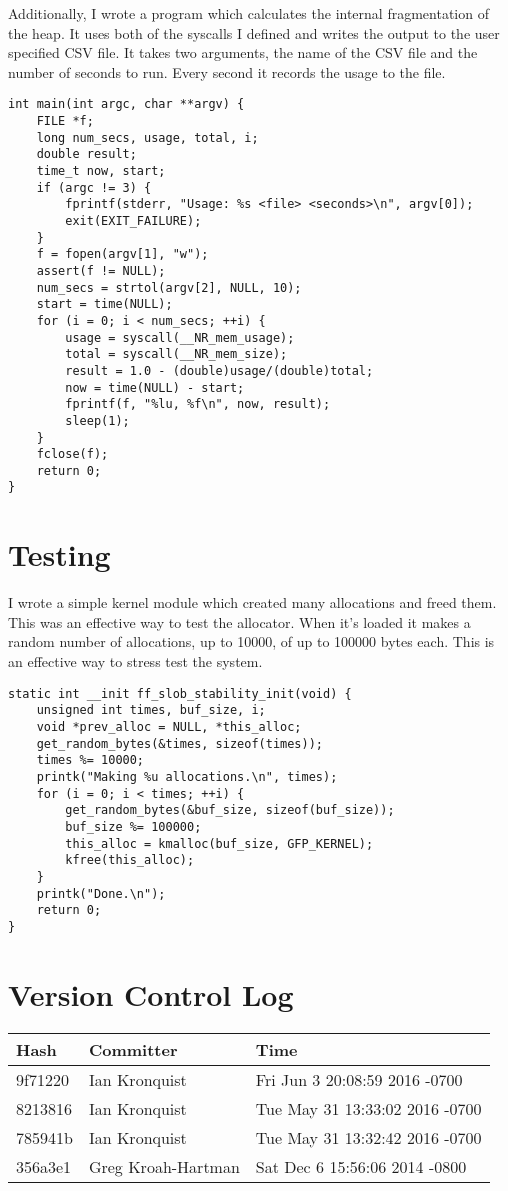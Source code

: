 \documentclass[10pt,conference,draftclsnofoot,onecolumn]{IEEEtran}
\begin{document}
Additionally, I wrote a program which calculates the internal fragmentation of the heap. It uses both of the syscalls I defined and writes the output to the user specified CSV file. It takes two arguments, the name of the CSV file and the number of seconds to run. Every second it records the usage to the file.
\begin{lstlisting}
int main(int argc, char **argv) {
	FILE *f;
	long num_secs, usage, total, i;
	double result;
	time_t now, start;
	if (argc != 3) {
		fprintf(stderr, "Usage: %s <file> <seconds>\n", argv[0]);
		exit(EXIT_FAILURE);
	}
	f = fopen(argv[1], "w");
	assert(f != NULL);
	num_secs = strtol(argv[2], NULL, 10);
	start = time(NULL);
	for (i = 0; i < num_secs; ++i) {
		usage = syscall(__NR_mem_usage);
		total = syscall(__NR_mem_size);
		result = 1.0 - (double)usage/(double)total;
		now = time(NULL) - start;
		fprintf(f, "%lu, %f\n", now, result);
		sleep(1);
	}
	fclose(f);
	return 0;
}
\end{lstlisting}

\section{Testing}
I wrote a simple kernel module which created many allocations and freed them. This was an effective way to test the allocator. When it's loaded it makes a random number of allocations, up to 10000, of up to 100000 bytes each. This is an effective way to stress test the system.

\begin{lstlisting}
static int __init ff_slob_stability_init(void) {
	unsigned int times, buf_size, i;
	void *prev_alloc = NULL, *this_alloc;
	get_random_bytes(&times, sizeof(times));
	times %= 10000;
	printk("Making %u allocations.\n", times);
	for (i = 0; i < times; ++i) {
		get_random_bytes(&buf_size, sizeof(buf_size));
		buf_size %= 100000;
		this_alloc = kmalloc(buf_size, GFP_KERNEL);
		kfree(this_alloc);
	}
	printk("Done.\n");
	return 0;
}
\end{lstlisting}

\section{Version Control Log}
\begin{tabular}{|p{5cm}|p{5cm}|p{5cm}}
    \textbf{Hash} & \textbf{Committer} & \textbf{Time} \\
    \hline
9f71220 & Ian Kronquist & Fri Jun 3 20:08:59 2016 -0700 \\
8213816 & Ian Kronquist & Tue May 31 13:33:02 2016 -0700 \\
785941b & Ian Kronquist & Tue May 31 13:32:42 2016 -0700 \\
356a3e1 & Greg Kroah-Hartman & Sat Dec 6 15:56:06 2014 -0800 \\
\end{tabular}
\end{document}
